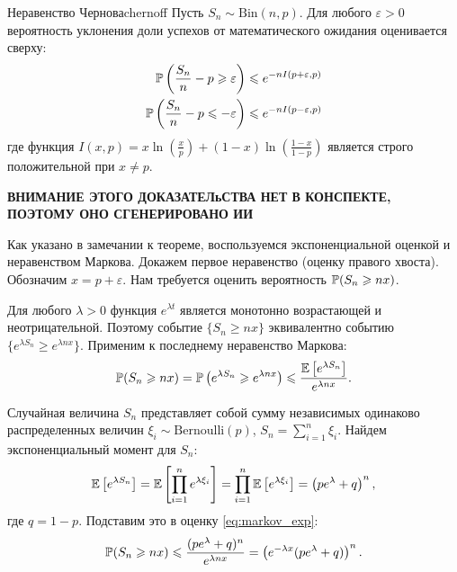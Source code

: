 \begin{theorem}{Неравенство Чернова}{chernoff}
    Пусть $S_n \sim \text{Bin}(n, p)$. Для любого $\varepsilon > 0$ вероятность уклонения доли успехов от математического ожидания оценивается сверху:
    \begin{align*}
        \P\left( \frac{S_n}{n} - p \geqslant \varepsilon \right) &\leqslant e^{-n I(p+\varepsilon, p)} \\
        \P\left( \frac{S_n}{n} - p \leqslant -\varepsilon \right) &\leqslant e^{-n I(p-\varepsilon, p)}
    \end{align*}
    где функция $I(x, p) = x \ln\left(\frac{x}{p}\right) + (1-x) \ln\left(\frac{1-x}{1-p}\right)$ является строго положительной при $x \neq p$.
\end{theorem}
\begin{proofbox}
\textbf{ВНИМАНИЕ ЭТОГО ДОКАЗАТЕЛьСТВА НЕТ В КОНСПЕКТЕ, ПОЭТОМУ ОНО СГЕНЕРИРОВАНО ИИ}

    Как указано в замечании к теореме, воспользуемся экспоненциальной оценкой и неравенством Маркова. 
    Докажем первое неравенство (оценку правого хвоста). Обозначим $x = p + \varepsilon$. Нам требуется оценить вероятность $\P(S_n \geqslant nx)$. 
    
    Для любого $\lambda > 0$ функция $e^{\lambda t}$ является монотонно возрастающей и неотрицательной. Поэтому событие $\{S_n \geqslant nx\}$ эквивалентно событию $\{e^{\lambda S_n} \geqslant e^{\lambda nx}\}$. Применим к последнему неравенство Маркова:
    \begin{align}\label{eq:markov_exp}
        \P(S_n \geqslant nx) = \P\left( e^{\lambda S_n} \geqslant e^{\lambda nx} \right) \leqslant \frac{\E \left[ e^{\lambda S_n} \right]}{e^{\lambda nx}}.
    \end{align}

    Случайная величина $S_n$ представляет собой сумму независимых одинаково распределенных величин $\xi_i \sim \text{Bernoulli}(p)$, $S_n = \sum_{i=1}^n \xi_i$. Найдем экспоненциальный момент для $S_n$:
    \begin{align*}
        \E \left[ e^{\lambda S_n} \right] = \E \left[ \prod_{i=1}^n e^{\lambda \xi_i} \right] = \prod_{i=1}^n \E \left[ e^{\lambda \xi_i} \right] = \left( p e^\lambda + q \right)^n,
    \end{align*}
    где $q = 1 - p$. Подставим это в оценку \eqref{eq:markov_exp}:
    \begin{align*}
        \P(S_n \geqslant nx) \leqslant \frac{(p e^\lambda + q)^n}{e^{\lambda nx}} = \left( e^{-\lambda x} (p e^\lambda + q) \right)^n.
    \end{align*}


\end{proofbox}
